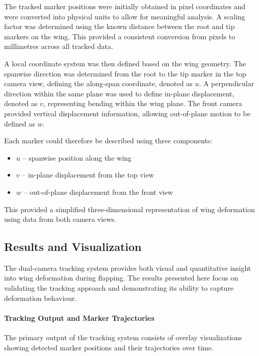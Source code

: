 The tracked marker positions were initially obtained in pixel coordinates and were converted into physical units to allow for meaningful analysis. A scaling factor was determined using the known distance between the root and tip markers on the wing. This provided a consistent conversion from pixels to millimetres across all tracked data.
 
A local coordinate system was then defined based on the wing geometry. The spanwise direction was determined from the root to the tip marker in the top camera view, defining the along-span coordinate, denoted as $u$. A perpendicular direction within the same plane was used to define in-plane displacement, denoted as $v$, representing bending within the wing plane. The front camera provided vertical displacement information, allowing out-of-plane motion to be defined as $w$.
 
Each marker could therefore be described using three components:

\begin{itemize}

\item $u$ – spanwise position along the wing

\item $v$ – in-plane displacement from the top view

\item $w$ – out-of-plane displacement from the front view

\end{itemize}
 
This provided a simplified three-dimensional representation of wing deformation using data from both camera views.
 
\subsection{Results and Visualization}
 
The dual-camera tracking system provides both visual and quantitative insight into wing deformation during flapping. The results presented here focus on validating the tracking approach and demonstrating its ability to capture deformation behaviour.
 
\paragraph{Tracking Output and Marker Trajectories}
 
The primary output of the tracking system consists of overlay visualizations showing detected marker positions and their trajectories over time.
 
